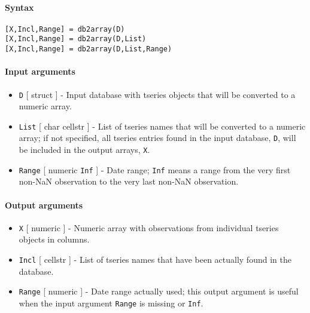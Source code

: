


	\paragraph{Syntax}\label{syntax}

\begin{verbatim}
[X,Incl,Range] = db2array(D)
[X,Incl,Range] = db2array(D,List)
[X,Incl,Range] = db2array(D,List,Range)
\end{verbatim}

\paragraph{Input arguments}\label{input-arguments}

\begin{itemize}
\item
  \texttt{D} {[} struct {]} - Input database with tseries objects that
  will be converted to a numeric array.
\item
  \texttt{List} {[} char \textbar{} cellstr {]} - List of tseries names
  that will be converted to a numeric array; if not specified, all
  tseries entries found in the input database, \texttt{D}, will be
  included in the output arrays, \texttt{X}.
\item
  \texttt{Range} {[} numeric \textbar{} \texttt{Inf} {]} - Date range;
  \texttt{Inf} means a range from the very first non-NaN observation to
  the very last non-NaN observation.
\end{itemize}

\paragraph{Output arguments}\label{output-arguments}

\begin{itemize}
\item
  \texttt{X} {[} numeric {]} - Numeric array with observations from
  individual tseries objects in columns.
\item
  \texttt{Incl} {[} cellstr {]} - List of tseries names that have been
  actually found in the database.
\item
  \texttt{Range} {[} numeric {]} - Date range actually used; this output
  argument is useful when the input argument \texttt{Range} is missing
  or \texttt{Inf}.
\end{itemize}

